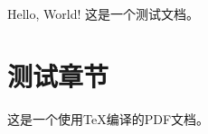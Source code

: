 \documentclass{article}
\begin{document}
Hello, World! 这是一个测试文档。

\section{测试章节}
这是一个使用TeX编译的PDF文档。
\end{document}
